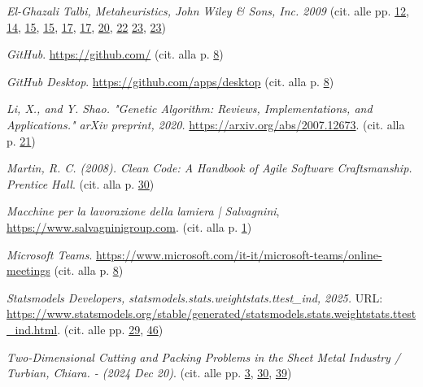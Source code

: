 \cleardoublepage

\hypertarget{bibliografia}{}

\nocite{*}

\printbibliography[heading=subbibliography,title={Riferimenti bibliografici},type=book]

\printbibliography[heading=subbibliography,title={Siti web consultati},type=online]





\renewcommand{\bibname}{Riferimenti bibliografici}

\begin{thebibliography}{1}

\bibitem{} 
\emph{El-Ghazali Talbi, Metaheuristics, John Wiley \& Sons, Inc. 2009} (cit. alle pp. \hyperlink{metaeuristiche}{12}, \hyperlink{img1}{14}, \hyperlink{img2}{15}, \hyperlink{img3}{15}, \hyperlink{img4}{17}, \hyperlink{img5}{17}, \hyperlink{elementi}{20}, \hyperlink{og}{22} \hyperlink{img6}{23}, \hyperlink{img7}{23})

\bibitem{}
\emph{GitHub}. \url{https://github.com/} (cit. alla p. \hyperlink{siti}{8})

\bibitem{}
\emph{GitHub Desktop}. \url{https://github.com/apps/desktop} (cit. alla p. \hyperlink{siti}{8})

\bibitem{} 
\emph{Li, X., and Y. Shao. "Genetic Algorithm: Reviews, Implementations, and Applications." arXiv preprint, 2020.} \url{https://arxiv.org/abs/2007.12673}. (cit. alla p. \hyperlink{ga}{21})

\bibitem{}
\emph{Martin, R. C. (2008). Clean Code: A Handbook of Agile Software Craftsmanship. Prentice Hall}. (cit. alla p. \hyperlink{cleancode}{30})

\bibitem{}
\emph{Macchine per la lavorazione della lamiera | Salvagnini}, \url{https://www.salvagninigroup.com}. (cit. alla p. \hyperlink{salvagnini}{1})

\bibitem{}
\emph{Microsoft Teams}. \url{https://www.microsoft.com/it-it/microsoft-teams/online-meetings} (cit. alla p. \hyperlink{siti}{8})

\bibitem{}
\emph{Statsmodels Developers, statsmodels.stats.weightstats.ttest\_ind, 2025.} URL: \url{https://www.statsmodels.org/stable/generated/statsmodels.stats.weightstats.ttest_ind.html}. (cit. alle pp. \hyperlink{ttest}{29}, \hyperlink{gls4}{46})

\bibitem{}
\emph{Two-Dimensional Cutting and Packing Problems in the Sheet Metal Industry / Turbian, Chiara. - (2024 Dec 20)}. (cit. alle pp. \hyperlink{statement}{3}, \hyperlink{chiara2}{30}, \hyperlink{chiara3}{39})


\end{thebibliography}